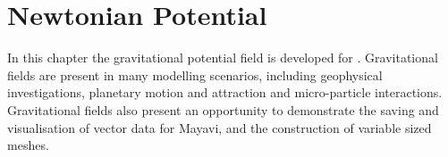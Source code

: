 
%
%
%

\section{Newtonian Potential}

In this chapter the gravitational potential field is developed for \esc.
Gravitational fields are present in many modelling scenarios, including
geophysical investigations, planetary motion and attraction and micro-particle
interactions. Gravitational fields also present an opportunity to demonstrate
the saving and visualisation of vector data for Mayavi, and the construction of
variable sized meshes.

